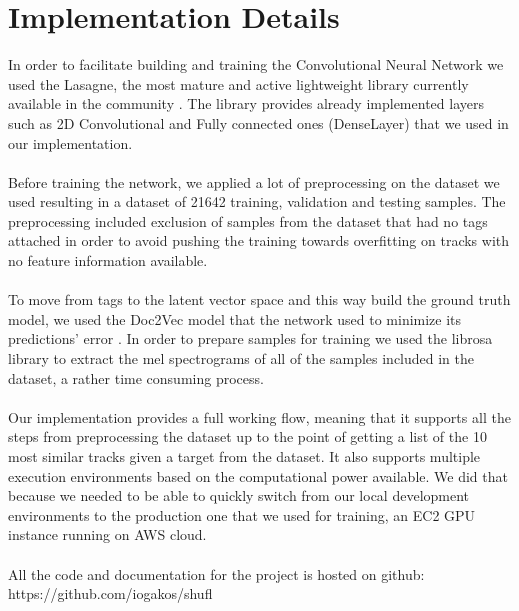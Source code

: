\documentclass[11pt, a4paper]{article}
\begin{document}
  \section{Implementation Details}
    In order to facilitate building and training the Convolutional Neural
    Network we used the Lasagne, the most mature and active lightweight library
    currently available in the community \cite{lasagne}. The library provides
    already implemented layers such as 2D Convolutional and Fully connected
    ones (DenseLayer) that we used in our implementation.
    \\ \\
    \noindent
    Before training the network, we applied a lot of preprocessing on the
    dataset we used resulting in a dataset of 21642 training, validation and 
    testing samples. The preprocessing included exclusion of samples from the
    dataset that had no tags attached in order to avoid pushing the training
    towards overfitting on tracks with no feature information available.
    \\ \\
    \noindent
    To move from tags to the latent vector space and this way build the ground
    truth model, we used the Doc2Vec model that the network used to minimize
    its predictions' error \cite{doc2vec}. In order to prepare samples for
    training we used the librosa library \cite{librosa} to extract the mel
    spectrograms of all of the samples included in the dataset, a rather time
    consuming process.
    \\ \\
    \noindent
    Our implementation provides a full working flow, meaning that it supports
    all the steps from preprocessing the dataset up to the point of getting
    a list of the 10 most similar tracks given a target from the dataset. It
    also supports multiple execution environments based on the computational
    power available. We did that because we needed to be able to quickly switch
    from our local development environments to the production one that we used
    for training, an EC2 GPU instance running on AWS cloud.
    \\ \\
    \noindent
    All the code and documentation for the project is hosted on github:\\
    https://github.com/iogakos/shufl
      
\end{document}
